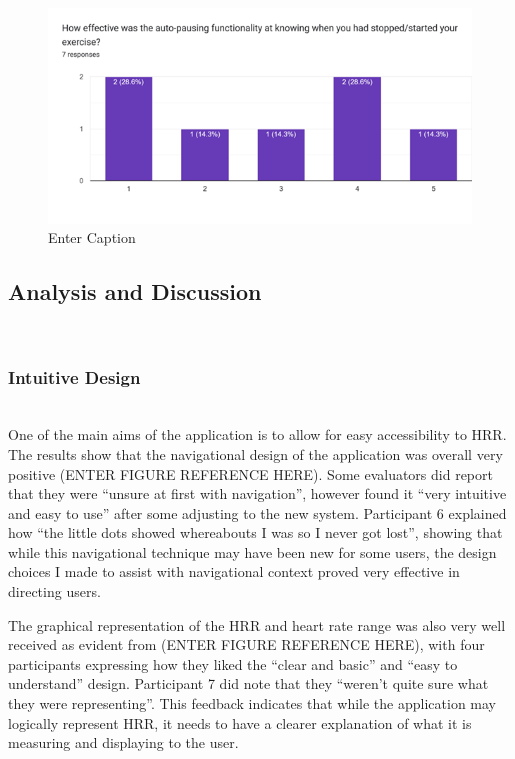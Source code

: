 \documentclass{l4proj}
\begin{document}
\begin{figure}[h!]
    \centering
    \includegraphics[width=0.75\linewidth]{dissertation//dissImages/PauseEffective.png}
    \caption{Enter Caption}
    \label{fig:enter-label}
\end{figure}

\subsection{Analysis and Discussion}
\label{sec:userstudyanalysis}

\noindent\mbox{}\\
\subsubsection{Intuitive Design}
\noindent\mbox{}\\

One of the main aims of the application is to allow for easy accessibility to HRR. The results show that the navigational design of the application was overall very positive (ENTER FIGURE REFERENCE HERE). Some evaluators did report that they were “unsure at first with navigation”, however found it “very intuitive and easy to use” after some adjusting to the new system. Participant 6 explained how “the little dots showed whereabouts I was so I never got lost”, showing that while this navigational technique may have been new for some users, the design choices I made to assist with navigational context proved very effective in directing users.

The graphical representation of the HRR and heart rate range was also very well received as evident from (ENTER FIGURE REFERENCE HERE), with four participants expressing how they liked the “clear and basic” and “easy to understand” design. Participant 7 did note that they “weren’t quite sure what they were representing”. This feedback indicates that while the application may logically represent HRR, it needs to have a clearer explanation of what it is measuring and displaying to the user.
\end{document}
